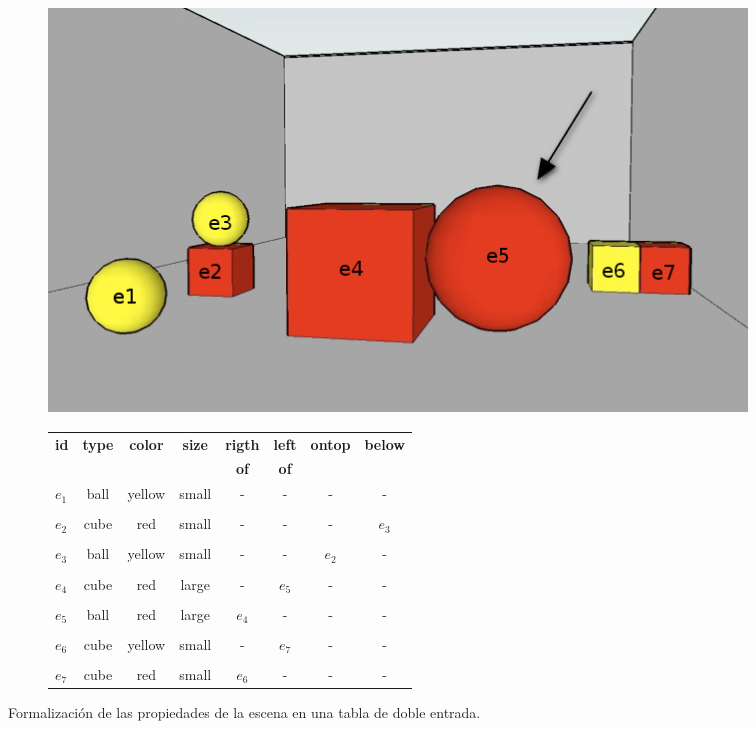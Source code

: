 \begin{figure}[ht]
%
\begin{subfigure}{.48\textwidth}
  \centering
\includegraphics[width=\textwidth]{images/22.jpg}
  \caption{}\label{GRE3D7-stimulus1-ids}
\end{subfigure}
%
\begin{subfigure}{.48\textwidth}
\begin{scriptsize}
\begin{tabular}{|l|c|c|c|c|c|c|c|}
\hline
\textbf {id}& 	\textbf {type}		&	\textbf {color}	&	\textbf {size}& \textbf {rigth} & \textbf {left} & \textbf {ontop}	& \textbf {below}	\\
   	   &  	    			&	    		&	     		&  \textbf {of}   		 &  \textbf {of}	    &  	&  \\
\hline \hline
$e_1$ & ball & yellow & small & - & - & - & - \\
& & & & & & & \\
$e_2$ & cube & red & small & - & - &- & $e_3$ \\
& & & & & & & \\
$e_3$ & ball & yellow & small & - & - & $e_2$ & -\\
& & & & & & & \\
$e_4$ & cube & red & large & - & $e_5$ & - & -\\
& & & & & & & \\
$e_5$ & ball & red & large & $e_4$ & - & - & -\\
& & & & & & & \\
$e_6$ & cube & yellow & small & - & $e_7$ & - & -\\
& & & & & & & \\
$e_7$ & cube & red & small & $e_6$ & - & - & -\\
\hline
\end{tabular}
\end{scriptsize}
\centering \hspace*{-8cm} \caption{}\label{tabla-propiedades}
\end{subfigure}
\caption{Formalizaci\'on de las propiedades de la escena en una tabla de doble entrada.}\label{contexto-tabla-propiedades}
\end{figure}

